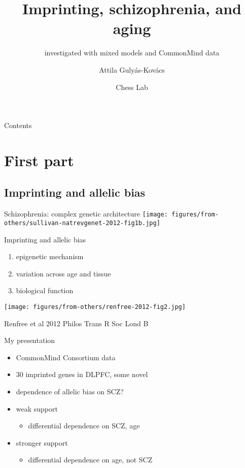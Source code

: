 \documentclass{beamer} %
\title{Imprinting, schizophrenia, and aging}
\subtitle{investigated with mixed models and CommonMind data}
\author{Attila Guly\'{a}s-Kov\'{a}cs}
\date{Chess Lab}
\begin{document}
\begin{frame}[plain, label=title]
\maketitle
\end{frame}

\begin{frame}{Contents}
\tableofcontents
\end{frame}

\section{First part}

\subsection{Imprinting and allelic bias}

\begin{frame}{Schizophrenia: complex genetic architecture}
\texttt{[image: figures/from-others/sullivan-natrevgenet-2012-fig1b.jpg]}
\end{frame}

\begin{frame}{Imprinting and allelic bias}
\begin{enumerate}
\item epigenetic mechanism
\item variation across age and tissue
\item biological function 
\end{enumerate}
\texttt{[image: figures/from-others/renfree-2012-fig2.jpg]}

{\tiny Renfree et al 2012 Philos Trans R Soc Lond B}

\end{frame}

\begin{frame}{My   presentation}
\begin{itemize}
\item<1> CommonMind Consortium data
\item<1> 30 imprinted genes in DLPFC, some novel
\item<1> dependence of allelic bias on SCZ? 
\item<1> weak support
\begin{itemize}
\item  differential dependence on SCZ, age
\end{itemize}
\item<2> stronger support
\begin{itemize}
\item  differential dependence on age, \alert{not} SCZ
\end{itemize}
\end{itemize}
\end{frame}
\end{document}
